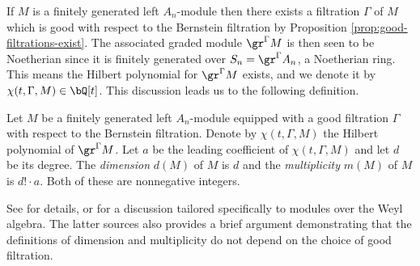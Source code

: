 If $M$ is a finitely generated left $A_n$-module then there exists a filtration $\Gamma$ of $M$ which is good with respect to the Bernstein filtration by Proposition \ref{prop:good-filtrations-exist}. The associated graded module $\gr^\Gamma M$ is then seen to be Noetherian since it is finitely generated over $S_n = \gr^\Gamma A_n$, a Noetherian ring. This means the Hilbert polynomial for $\gr^\Gamma M$ exists, and we denote it by $\chi(t,\Gamma,M) \in \bQ[t]$. This discussion leads us to the following definition.
\begin{defn}\label{defn:dimension-multiplicity}
	Let $M$ be a finitely generated left $A_n$-module equipped with a good filtration $\Gamma$ with respect to the Bernstein filtration. Denote by $\chi(t,\Gamma,M)$ the Hilbert polynomial of $\gr^\Gamma M$. Let $a$ be the leading coefficient of $\chi(t,\Gamma,M)$ and let $d$ be its degree. The \emph{dimension} $d(M)$ of $M$ is $d$ and the \emph{multiplicity} $m(M)$ of $M$ is $d!\cdot a$. Both of these are nonnegative integers.
\end{defn}
See \cite{am} for details, or \cite[Chapter 9]{d-mod-primer} for a discussion tailored specifically to modules over the Weyl algebra. The latter sources also provides a brief argument demonstrating that the definitions of dimension and multiplicity do not depend on the choice of good filtration.

